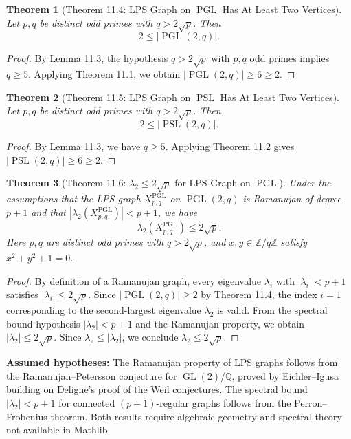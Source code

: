 \documentclass[11pt]{article}
\theoremstyle{plain}
\newtheorem*{theorem}{Theorem}
\theoremstyle{definition}
\theoremstyle{remark}
\begin{document}
\begin{theorem}[Theorem 11.4: LPS Graph on $\operatorname{PGL}$ Has At Least Two Vertices]
Let $p, q$ be distinct odd primes with $q > 2\sqrt{p}$. Then
\[
2 \leq |\operatorname{PGL}(2,q)|.
\]
\end{theorem}

\begin{proof}
By Lemma 11.3, the hypothesis $q > 2\sqrt{p}$ with $p, q$ odd primes implies $q \geq 5$. Applying Theorem 11.1, we obtain $|\operatorname{PGL}(2,q)| \geq 6 \geq 2$.
\end{proof}

\begin{theorem}[Theorem 11.5: LPS Graph on $\operatorname{PSL}$ Has At Least Two Vertices]
Let $p, q$ be distinct odd primes with $q > 2\sqrt{p}$. Then
\[
2 \leq |\operatorname{PSL}(2,q)|.
\]
\end{theorem}

\begin{proof}
By Lemma 11.3, we have $q \geq 5$. Applying Theorem 11.2 gives $|\operatorname{PSL}(2,q)| \geq 6 \geq 2$.
\end{proof}

\begin{theorem}[Theorem 11.6: $\lambda_2 \leq 2\sqrt{p}$ for LPS Graph on $\operatorname{PGL}$]
Under the assumptions that the LPS graph $X_{p,q}^{\operatorname{PGL}}$ on $\operatorname{PGL}(2,q)$ is Ramanujan of degree $p+1$ and that $|\lambda_2(X_{p,q}^{\operatorname{PGL}})| < p+1$, we have
\[
\lambda_2(X_{p,q}^{\operatorname{PGL}}) \leq 2\sqrt{p}.
\]
Here $p, q$ are distinct odd primes with $q > 2\sqrt{p}$, and $x, y \in \mathbb{Z}/q\mathbb{Z}$ satisfy $x^2 + y^2 + 1 = 0$.
\end{theorem}

\begin{proof}
By definition of a Ramanujan graph, every eigenvalue $\lambda_i$ with $|\lambda_i| < p+1$ satisfies $|\lambda_i| \leq 2\sqrt{p}$. Since $|\operatorname{PGL}(2,q)| \geq 2$ by Theorem 11.4, the index $i = 1$ corresponding to the second-largest eigenvalue $\lambda_2$ is valid. From the spectral bound hypothesis $|\lambda_2| < p+1$ and the Ramanujan property, we obtain $|\lambda_2| \leq 2\sqrt{p}$. Since $\lambda_2 \leq |\lambda_2|$, we conclude $\lambda_2 \leq 2\sqrt{p}$.
\end{proof}

\textbf{Assumed hypotheses:} The Ramanujan property of LPS graphs follows from the Ramanujan--Petersson conjecture for $\operatorname{GL}(2)/\mathbb{Q}$, proved by Eichler--Igusa building on Deligne's proof of the Weil conjectures. The spectral bound $|\lambda_2| < p+1$ for connected $(p+1)$-regular graphs follows from the Perron--Frobenius theorem. Both results require algebraic geometry and spectral theory not available in Mathlib.
\end{document}
